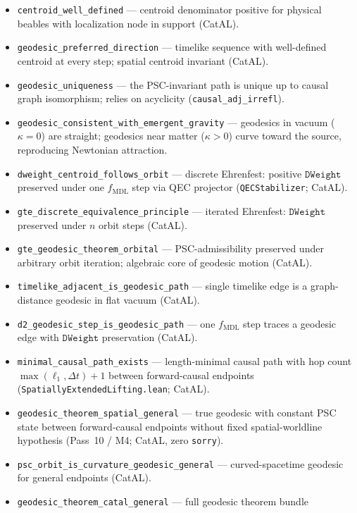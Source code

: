 \documentclass[11pt,a4paper]{article}
\theoremstyle{definition}
\begin{document}
\begin{itemize}[nosep]
  model; CatAL).
\item \lstinline|centroid_well_defined| --- centroid denominator positive for
  physical beables with localization node in support (CatAL).
\item \lstinline|geodesic_preferred_direction| --- timelike sequence with
  well-defined centroid at every step; spatial centroid invariant (CatAL).
\item \lstinline|geodesic_uniqueness| --- the PSC-invariant path is unique up to
  causal graph isomorphism; relies on acyclicity (\lstinline|causal_adj_irrefl|).
\item \lstinline|geodesic_consistent_with_emergent_gravity| --- geodesics in
  vacuum ($\kappa = 0$) are straight; geodesics near matter ($\kappa > 0$) curve
  toward the source, reproducing Newtonian attraction.
\item \lstinline|dweight_centroid_follows_orbit| --- discrete Ehrenfest:
  positive $\mathtt{DWeight}$ preserved under one $f_{\mathrm{MDL}}$ step via
  QEC projector (\texttt{QECStabilizer}; CatAL).
\item \lstinline|gte_discrete_equivalence_principle| --- iterated Ehrenfest:
  $\mathtt{DWeight}$ preserved under $n$ orbit steps (CatAL).
\item \lstinline|gte_geodesic_theorem_orbital| --- PSC-admissibility preserved
  under arbitrary orbit iteration; algebraic core of geodesic motion (CatAL).
\item \lstinline|timelike_adjacent_is_geodesic_path| --- single timelike edge is
  a graph-distance geodesic in flat vacuum (CatAL).
\item \lstinline|d2_geodesic_step_is_geodesic_path| --- one $f_{\mathrm{MDL}}$ step
  traces a geodesic edge with $\mathtt{DWeight}$ preservation (CatAL).
\item \lstinline|minimal_causal_path_exists| --- length-minimal causal path with
  hop count $\max(\ell_1,\Delta t)+1$ between forward-causal endpoints
  (\texttt{SpatiallyExtendedLifting.lean}; CatAL).
\item \lstinline|geodesic_theorem_spatial_general| --- true geodesic with constant
  PSC state between forward-causal endpoints without fixed spatial-worldline
  hypothesis (Pass~10 / M4; CatAL, zero \lstinline|sorry|).
\item \lstinline|psc_orbit_is_curvature_geodesic_general| --- curved-spacetime geodesic
  for general endpoints (CatAL).
\item \lstinline|geodesic_theorem_catal_general| --- full geodesic theorem bundle

\end{itemize}
\end{document}
